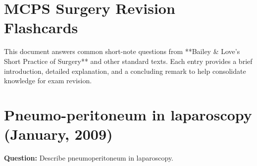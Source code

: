 \documentclass{article}
\begin{document}
\section*{MCPS Surgery Revision Flashcards}

This document answers common short-note questions from **Bailey \& Love's Short Practice of Surgery** and other standard texts. Each entry provides a brief introduction, detailed explanation, and a concluding remark to help consolidate knowledge for exam revision.


\section{Pneumo-peritoneum in laparoscopy (January, 2009)}

\textbf{Question:} Describe pneumoperitoneum in laparoscopy.
\end{document}

